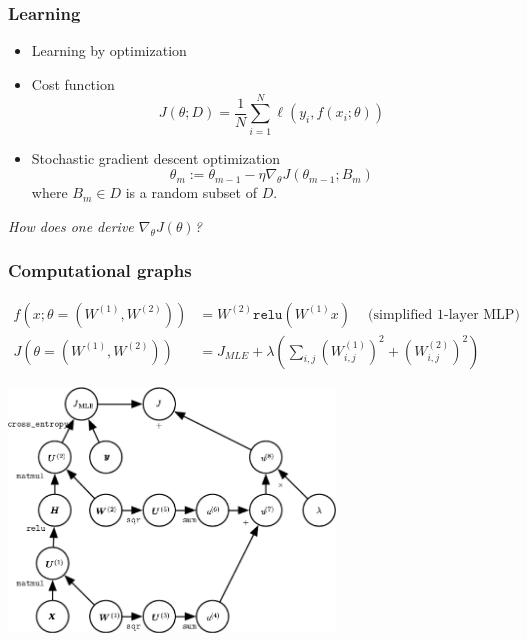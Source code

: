 \documentclass{beamer}
\begin{document}
\begin{frame}
    \frametitle{Learning}

    \begin{itemize}
        \item Learning by optimization
        \item Cost function $$J(\theta; D) = \frac{1}{N} \sum_{i=1}^N \ell(y_i, f(x_i; \theta))$$
        \item Stochastic gradient descent optimization $$\theta_m := \theta_{m-1} - \eta \nabla_\theta J(\theta_{m-1}; B_m)$$
        where $B_m \in D$ is a random subset of $D$.

    \end{itemize}

    \vspace{0.5cm}

    \centering
    \it How does one derive  $\nabla_\theta J(\theta)$?


\end{frame}

\begin{frame}
    \frametitle{Computational graphs}

    \begin{align*}
        f(x; \theta=(W^{(1)}, W^{(2)})) &= W^{(2)} \texttt{relu}(W^{(1)}x) \quad~\text{(simplified 1-layer MLP)}\\
        J(\theta=(W^{(1)}, W^{(2)})) &= J_{MLE} + \lambda \left( \sum_{i,j} \left( W_{i,j}^{(1)} \right)^2 + \left( W_{i,j}^{(2)} \right)^2 \right)
    \end{align*}

    \begin{center}
        \includegraphics[width=0.65\textwidth]{figures/graph1.png}
    \end{center}



\end{frame}
\end{document}
